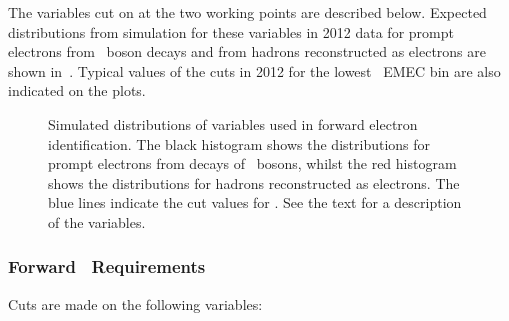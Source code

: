 The variables cut on at the two working points are described below. Expected
distributions from simulation for these variables in 2012 data for
prompt electrons from \Z\ boson decays and from hadrons reconstructed as electrons
are shown in~. Typical values of the
cuts in 2012 for the lowest \nPV\ EMEC bin are also indicated on the plots.

\begin{figure}[h]
\centering
    \caption[Distributions of forward electron identification variables for
    electrons and hadrons: $\lambda_{\rm centre}$,  $\langle \lambda^2 \rangle$,
    $\langle r^2 \rangle$, $f_{\rm max}$, Normalised longitudinal moment,
    Normalised lateral moment]
    {Simulated distributions of variables used in forward electron
    identification. The black histogram shows the distributions for prompt
    electrons from decays of \Z\ bosons, whilst the red histogram shows the
    distributions for hadrons reconstructed as electrons. The blue lines
    indicate the cut values for . See the text for a
    description of the variables.}
\label{fig:el-id-showershapes-forward}
\end{figure}

\subsubsection{Forward \loose\ Requirements}

Cuts are made on the following variables:

